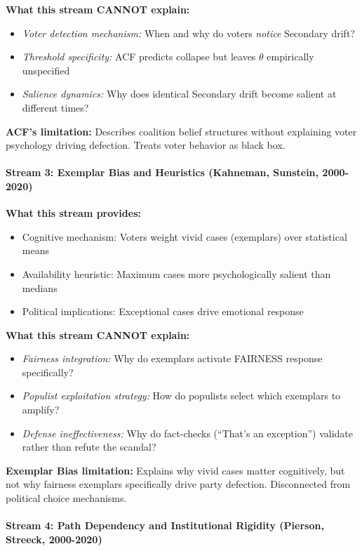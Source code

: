 \textbf{What this stream CANNOT explain:}
\begin{itemize}[nosep]
\item \textit{Voter detection mechanism:} When and why do voters \textit{notice} Secondary drift?
\item \textit{Threshold specificity:} ACF predicts collapse but leaves $\theta$ empirically unspecified
\item \textit{Salience dynamics:} Why does identical Secondary drift become salient at different times?
\end{itemize}

\textbf{ACF's limitation:} Describes coalition belief structures without explaining voter psychology
driving defection. Treats voter behavior as black box.

\paragraph{Stream 3: Exemplar Bias and Heuristics (Kahneman, Sunstein, 2000-2020)}

\textbf{What this stream provides:}
\begin{itemize}[nosep]
\item Cognitive mechanism: Voters weight vivid cases (exemplars) over statistical means
\item Availability heuristic: Maximum cases more psychologically salient than medians
\item Political implications: Exceptional cases drive emotional response
\end{itemize}

\textbf{What this stream CANNOT explain:}
\begin{itemize}[nosep]
\item \textit{Fairness integration:} Why do exemplars activate FAIRNESS response specifically?
\item \textit{Populist exploitation strategy:} How do populists select which exemplars to amplify?
\item \textit{Defense ineffectiveness:} Why do fact-checks (``That's an exception'') validate rather than
refute the scandal?
\end{itemize}

\textbf{Exemplar Bias limitation:} Explains why vivid cases matter cognitively, but not why
fairness exemplars specifically drive party defection. Disconnected from political choice mechanisms.

\paragraph{Stream 4: Path Dependency and Institutional Rigidity (Pierson, Streeck, 2000-2020)}

